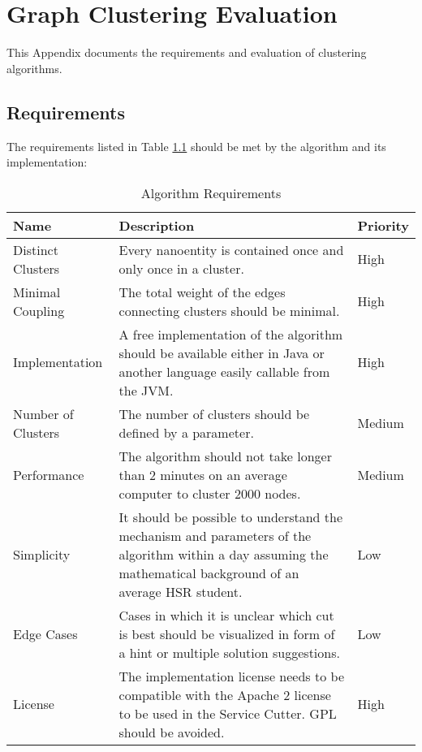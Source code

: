 \chapter{Graph Clustering Evaluation}
\label{appendix:graphClustering}
\label{appendix:graphClusteringAlgs}

This Appendix documents the requirements and evaluation of clustering algorithms. 

\section{Requirements}

The requirements listed in Table \ref{tab:requirementsAlgorithm} should be met by the algorithm and its implementation:

\begin{table}[H]
	\centering
	\caption{Algorithm Requirements}
	\label{tab:requirementsAlgorithm}
	\begin{tabular}{|p{100pt}|p{250pt}|p{50pt}|}
		\hline	
		Name & Description & Priority \\
		\hline
		Distinct Clusters & Every nanoentity is contained once and only once in a cluster. & High  \\
		\hline
		Minimal Coupling & The total weight of the edges connecting clusters should be minimal. & High \\
		\hline
		Implementation & A free implementation of the algorithm should be available either in Java or another language easily callable from the \gls{JVM}. & High  \\
		\hline
		Number of Clusters & The number of clusters should be defined by a parameter. & Medium \\
		\hline
		Performance & The algorithm should not take longer than 2 minutes on an average computer to cluster 2000 nodes.& Medium \\
		\hline
		Simplicity & It should be possible to understand the mechanism and parameters of the algorithm within a day assuming the mathematical background of an average \gls{HSR} student. & Low \\
		\hline
		Edge Cases & Cases in which it is unclear which cut is best should be visualized in form of a hint or multiple solution suggestions. & Low \\
		\hline
		License & The implementation license needs to be compatible with the Apache 2 license to be used in the Service Cutter. GPL should be avoided. & High \\
		\hline
	\end{tabular}
\end{table}

